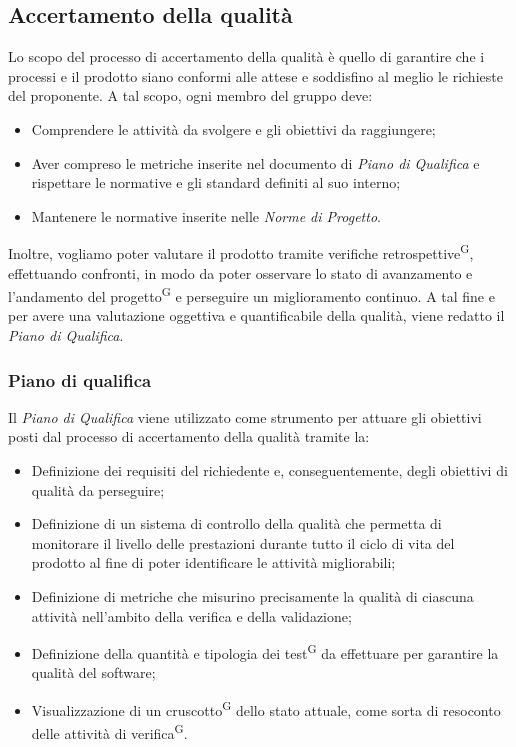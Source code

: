 \subsection{Accertamento della qualità}\label{sec:processi_di_supporto:accertamento_qualità}
Lo scopo del processo di accertamento della qualità è quello di garantire che i processi e il prodotto siano conformi alle attese e soddisfino al meglio le richieste del proponente. 
A tal scopo, ogni membro del gruppo deve:
\begin{itemize}
    \item Comprendere le attività da svolgere e gli obiettivi da raggiungere;
    \item Aver compreso le metriche inserite nel documento di \textit{Piano di Qualifica} e rispettare le normative e gli standard definiti al suo interno;
    \item Mantenere le normative inserite nelle \textit{Norme di Progetto}.
\end{itemize}
Inoltre, vogliamo poter valutare il prodotto tramite verifiche retrospettive\textsuperscript{G}, effettuando confronti, in modo da poter osservare lo stato di avanzamento e l'andamento del progetto\textsuperscript{G} e perseguire un miglioramento continuo.
A tal fine e per avere una valutazione oggettiva e quantificabile della qualità, viene redatto il \textit{Piano di Qualifica}.

\subsubsection{Piano di qualifica}
Il \textit{Piano di Qualifica} 
viene utilizzato come strumento per attuare gli obiettivi posti dal processo di accertamento della qualità tramite la:
\begin{itemize}
    \item Definizione dei requisiti del richiedente e, conseguentemente, degli obiettivi di qualità da perseguire;
    \item Definizione di un sistema di controllo della qualità che permetta di monitorare il livello delle prestazioni durante tutto il ciclo di vita del prodotto al fine di poter identificare le attività migliorabili;
    \item Definizione di metriche che misurino precisamente la qualità di ciascuna attività nell'ambito della verifica e della validazione;
    \item Definizione della quantità e tipologia dei test\textsuperscript{G} da effettuare per garantire la qualità del software;
    \item Visualizzazione di un cruscotto\textsuperscript{G} dello stato attuale, come sorta di resoconto delle attività di verifica\textsuperscript{G}.
\end{itemize}


